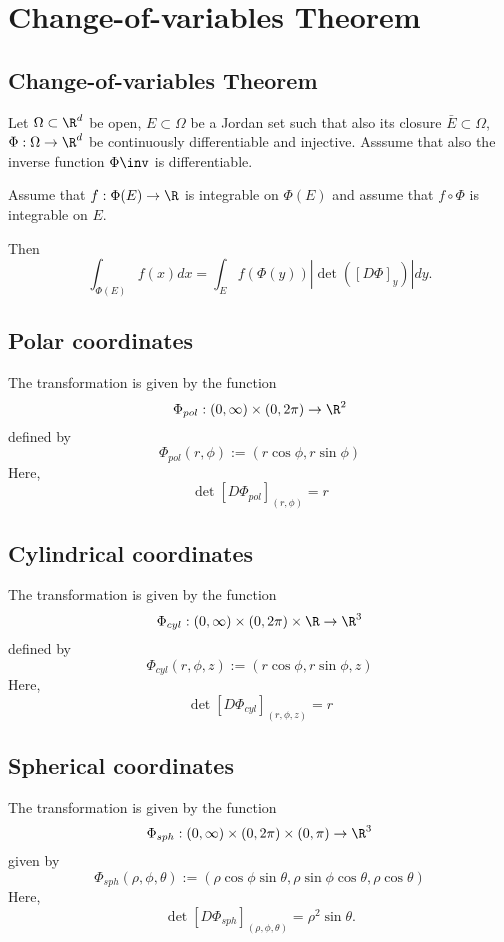 \section{Change-of-variables Theorem}

\subsection{Change-of-variables Theorem}
\begin{theorem}
    Let $\Omega \subset \R^d$ be open, $E \subset \Omega$ be a Jordan set such that also its closure $\bar{E} \subset \Omega$,
    $\Phi:\Omega \to \R^d$ be continuously differentiable and injective. Asssume that also the inverse function $\Phi\inv$ is
    differentiable.

    Assume that $f:\Phi(E) \to \R$ is integrable on $\Phi(E)$ and assume that $f \circ \Phi$ is integrable on $E$.

    Then
    $$\int_{\Phi(E)}f(x)dx = \int_Ef(\Phi(y))|\det([D\Phi]_y)|dy.$$
\end{theorem}

\subsection{Polar coordinates}
The transformation is given by the function
$$\Phi_{pol}:(0,\infty)\times(0,2\pi) \to \R^2$$
defined by
$$\Phi_{pol}(r,\phi):=(r\cos\phi,r\sin\phi)$$
Here,
$$\det[D\Phi_{pol}]_{(r,\phi)} = r$$

\subsection{Cylindrical coordinates}
The transformation is given by the function
$$\Phi_{cyl}:(0,\infty) \times (0,2\pi) \times \R \to \R^3$$
defined by
$$\Phi_{cyl}(r,\phi,z) := (r\cos\phi,r\sin\phi,z)$$
Here,
$$\det[D\Phi_{cyl}]_{(r,\phi,z)} = r$$

\subsection{Spherical coordinates}
The transformation is given by the function
$$\Phi_{sph}:(0,\infty) \times (0,2\pi) \times (0,\pi) \to \R^3$$
given by
$$\Phi_{sph}(\rho,\phi,\theta) := (\rho\cos\phi\sin\theta,\rho\sin\phi\cos\theta,\rho\cos\theta)$$
Here,
$$\det[D\Phi_{sph}]_{(\rho,\phi,\theta)} = \rho^2\sin\theta.$$
